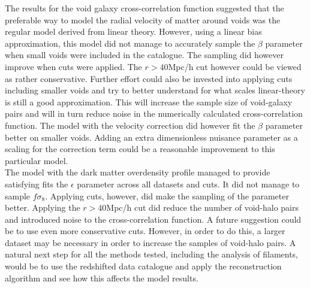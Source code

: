 The results for the void galaxy cross-correlation function suggested that the preferable way to model the radial velocity of matter around voids was the regular model derived from linear theory. However, using a linear bias approximation, this model did not manage to accurately sample the $\beta$ parameter when small voids were included in the catalogue. The sampling did however improve when cuts were applied. The $r>40$Mpc/h cut however could be viewed as rather conservative. Further effort could also be invested into applying cuts including smaller voids and try to better understand for what scales linear-theory is still a good approximation. This will increase the sample size of void-galaxy pairs and will in turn reduce noise in the numerically calculated cross-correlation function. The model with the velocity correction did however fit the $\beta$ parameter better on smaller voids. Adding an extra dimensionless nuisance parameter as a scaling for the correction term could be a reasonable improvement to this particular model.\\\indent
The model with the dark matter overdensity profile managed to provide satisfying fits the $\epsilon$ parameter across all datasets and cuts. It did not manage to sample $f\sigma_8$. Applying cuts, however, did make the sampling of the parameter better. Applying the $r>40$Mpc/h cut did reduce the number of void-halo pairs and introduced noise to the cross-correlation function. A future suggestion could be to use even more conservative cuts. However, in order to do this, a larger dataset may be necessary in order to increase the samples of void-halo pairs. A natural next step for all the methods tested, including the analysis of filaments, would be to use the redshifted data catalogue and apply the reconstruction algorithm and see how this affects the model results.